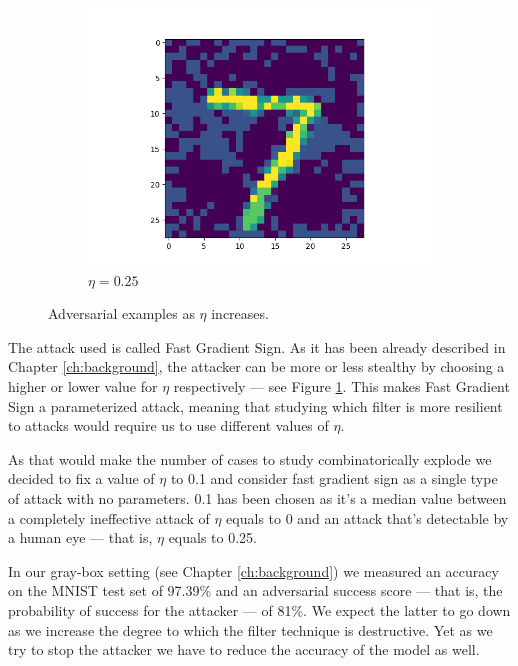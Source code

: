 \begin{figure}
\begin{subfigure}{0.3\linewidth}
    \includegraphics[width=\linewidth]{adversarial-input-fc-100-100-10-025.png}
    \caption{$\eta = 0.25$}
  \end{subfigure}
  \caption{Adversarial examples as $\eta$ increases.}
  \label{fig:fgs-increasing-eta}
\end{figure}

The attack used is called Fast Gradient Sign. As it has been already
described in Chapter \ref{ch:background}, the attacker can be more or
less stealthy by choosing a higher or lower value for $\eta$
respectively --- see Figure \ref{fig:fgs-increasing-eta}. This makes
Fast Gradient Sign a parameterized attack, meaning that studying which
filter is more resilient to attacks would require us to use different
values of $\eta$.

As that would make the number of cases to study
combinatorically explode we decided to fix a value of $\eta$ to 0.1 and
consider fast gradient sign as a single type of attack with no
parameters. 0.1 has been chosen as it's a median value
between a completely ineffective attack of $\eta$ equals to 0 and an
attack that's detectable by a human eye --- that is, $\eta$ equals
to 0.25.

In our gray-box setting (see Chapter \ref{ch:background}) we measured
an accuracy on the MNIST test set of 97.39\% and an adversarial success
score --- that is, the probability of success for the attacker --- of
81\%. We expect the latter to go down as we increase the degree
to which the filter technique is destructive. Yet as we try to stop the
attacker we have to reduce the accuracy of the model as well.

